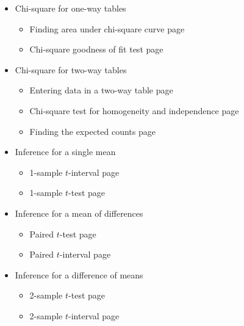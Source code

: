 \begin{itemize}
\item[] Chi-square for one-way tables
\begin{itemize}\vspace{-1mm}
\setlength{\itemsep}{0mm}
\item[] Finding area under chi-square curve \hfill page~\pageref{chisqtail}
\item[] Chi-square goodness of fit test \hfill page~\pageref{GOF}
\end{itemize}


\item[]  Chi-square for two-way tables
\begin{itemize}\vspace{-1mm}
\setlength{\itemsep}{0mm}
\item[] Entering data in a two-way table \hfill page~\pageref{2waytable}
\item[] Chi-square test for homogeneity and independence  \hfill page~\pageref{chisq2waytest}
\item[] Finding the expected counts  \hfill page~\pageref{expectedcounts}
\end{itemize}

\item[]  Inference for a single mean
\begin{itemize}\vspace{-1mm}
\setlength{\itemsep}{0mm}
\item[] 1-sample $t$-interval \hfill page~\pageref{1SampTint}
\item[] 1-sample $t$-test  \hfill page~\pageref{1SampTtest}
\end{itemize}



\item[] Inference for a mean of differences
\begin{itemize}\vspace{-1mm}
\setlength{\itemsep}{0mm}
\item[] Paired $t$-test \hfill page~\pageref{matchedpairsttest}
\item[] Paired $t$-interval  \hfill page~\pageref{matchedpairstint}
\end{itemize}


\item[] Inference for a difference of means 
\begin{itemize}\vspace{-1mm}
\setlength{\itemsep}{0mm}
\item[] 2-sample $t$-test  \hfill page~\pageref{2SampTtest}
\item[] 2-sample $t$-interval \hfill page~\pageref{2SampTint}
\end{itemize}



\end{itemize}
